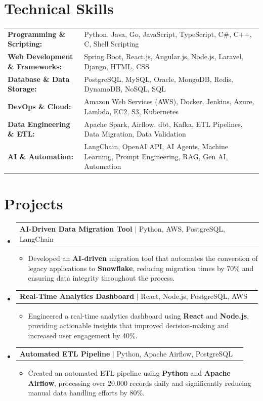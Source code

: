 \documentclass[letterpaper,10pt]{article}
\makeatletter
\newcommand{\resumeItem}[1]{
  \item{\fontsize{8pt}{9pt}\selectfont
    #1 \vspace{-3pt}
  }
}
\newcommand{\resumeProjectHeading}[2]{
    \item
    \begin{tabular*}{1.001\textwidth}{l@{\extracolsep{\fill}}r}
      \fontsize{8.5pt}{10pt}#1 & \textbf{\fontsize{8.5pt}{10pt} #2}\\
    \end{tabular*}\vspace{-7pt}
}
\newcommand{\resumeSubHeadingListStart}{\begin{itemize}[leftmargin=0pt, label={}]}
\newcommand{\resumeSubHeadingListEnd}{\end{itemize}}
\newcommand{\resumeItemListStart}{\begin{itemize}[leftmargin=*]}
\newcommand{\resumeItemListEnd}{\end{itemize}\vspace{-5pt}}
\makeatother
\begin{document}
\section{Technical Skills}
        \vspace{-14pt}
        \begin{table}[h]
            \fontsize{8pt}{9pt}\selectfont
            \begin{tabular}{p{0.3\linewidth} p{0.7\linewidth}}
                \textbf{Programming \& Scripting:} & Python, Java, Go, JavaScript, TypeScript, C\#, C++, C, Shell Scripting \\
                \textbf{Web Development \& Frameworks:} & Spring Boot, React.js, Angular.js, Node.js, Laravel, Django, HTML, CSS \\
                \textbf{Database \& Data Storage:} & PostgreSQL, MySQL, Oracle, MongoDB, Redis, DynamoDB, NoSQL, SQL \\
                \textbf{DevOps \& Cloud:} & Amazon Web Services (AWS), Docker, Jenkins, Azure, Lambda, EC2, S3, Kubernetes \\
                \textbf{Data Engineering \& ETL:} & Apache Spark, Airflow, dbt, Kafka, ETL Pipelines, Data Migration, Data Validation \\
                \textbf{AI \& Automation:} & LangChain, OpenAI API, AI Agents, Machine Learning, Prompt Engineering, RAG, Gen AI, Automation \\
            \end{tabular}
        \end{table}
 \vspace{-18pt}

\section{Projects}
    \vspace{-5pt}
    \resumeSubHeadingListStart
          \resumeProjectHeading
            {\textbf{AI-Driven Data Migration Tool} $|$ Python, AWS, PostgreSQL, LangChain}{}
            \resumeItemListStart
                \resumeItem{Developed an \textbf{AI-driven} migration tool that automates the conversion of legacy applications to \textbf{Snowflake}, reducing migration times by 70\% and ensuring data integrity throughout the process.}
            \resumeItemListEnd
        \vspace{-12pt}
    
        \resumeProjectHeading
            {\textbf{Real-Time Analytics Dashboard} $|$ React, Node.js, PostgreSQL, AWS}{}
        \resumeItemListStart
                \resumeItem{Engineered a real-time analytics dashboard using \textbf{React} and \textbf{Node.js}, providing actionable insights that improved decision-making and increased user engagement by 40\%.}
        \resumeItemListEnd
      \vspace{-12pt}
      \resumeProjectHeading
        {\textbf{Automated ETL Pipeline} $|$ Python, Apache Airflow, PostgreSQL}{}
    \resumeItemListStart
            \resumeItem{Created an automated ETL pipeline using \textbf{Python} and \textbf{Apache Airflow}, processing over 20,000 records daily and significantly reducing manual data handling efforts by 80\%.}
    \resumeItemListEnd
    \resumeSubHeadingListEnd
\end{document}
